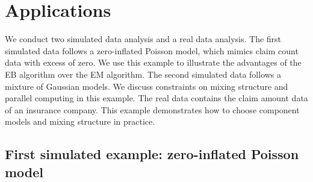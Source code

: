 \documentclass[11pt]{article}
\numberwithin{equation}{section}
\begin{document}
\section{Applications}\label{sec:application}

We conduct two simulated data analysis and a real data analysis. 
The first simulated data follows a zero-inflated Poisson model, which mimics claim count data with excess of zero.
We use this example to illustrate the advantages of the EB algorithm over the EM algorithm.
The second simulated data follows a mixture of Gaussian models. 
We discuss constraints on mixing structure and parallel computing in this example.
The real data contains the claim amount data of an insurance company. 
This example demonstrates how to choose component models and mixing structure in practice.

\subsection{First simulated example: zero-inflated Poisson model}
\end{document}
